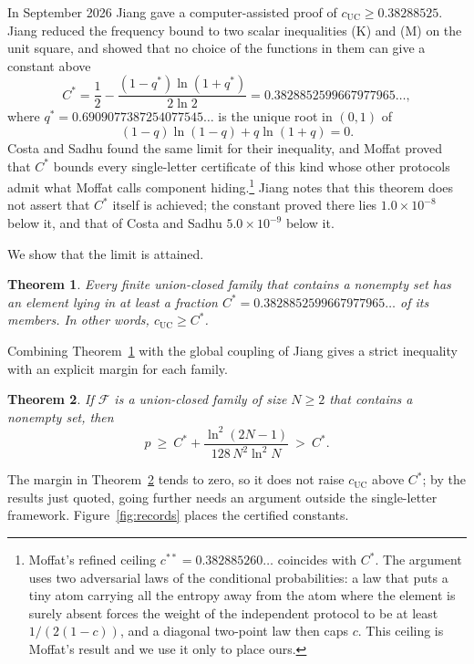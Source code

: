 \documentclass[aps,prd,twocolumn,superscriptaddress,nofootinbib,longbibliography,floatfix,amsmath,amssymb,10pt]{revtex4-2}
\theoremstyle{plain}
\theoremstyle{definition}
\theoremstyle{plain}
\newtheorem{mainthm}{Theorem}
\newcommand{\cF}{\mathcal{F}}
\newcommand{\qs}{q^{*}}
\newcommand{\Cs}{C^{*}}
\begin{document}
In September 2026 Jiang \cite{Jia26} gave a computer-assisted proof of $c_{\mathrm{UC}}\ge 0.38288525$. Jiang reduced the frequency bound to two scalar inequalities (K) and (M) on the unit square, and showed that no choice of the functions in them can give a constant above
\begin{equation}\label{eq:Cstar}
\Cs=\frac12-\frac{(1-\qs)\ln(1+\qs)}{2\ln 2}=0.3828852599667977965\ldots,
\end{equation}
where $\qs=0.6909077387254077545\ldots$ is the unique root in $(0,1)$ of
\begin{equation}\label{eq:qstar}
(1-q)\ln(1-q)+q\ln(1+q)=0 .
\end{equation}
Costa and Sadhu \cite{CS26} found the same limit for their inequality, and Moffat \cite{Mof26} proved that $\Cs$ bounds every single-letter certificate of this kind whose other protocols admit what Moffat calls component hiding.\footnote{Moffat's refined ceiling $c^{**}=0.382885260\ldots$ coincides with $\Cs$. The argument uses two adversarial laws of the conditional probabilities: a law that puts a tiny atom carrying all the entropy away from the atom where the element is surely absent forces the weight of the independent protocol to be at least $1/(2(1-c))$, and a diagonal two-point law then caps $c$. This ceiling is Moffat's result and we use it only to place ours.} Jiang notes that this theorem does not assert that $\Cs$ itself is achieved; the constant proved there lies $1.0\times10^{-8}$ below it, and that of Costa and Sadhu $5.0\times 10^{-9}$ below it.

We show that the limit is attained.

\begin{mainthm}\label{thm:main}
Every finite union-closed family that contains a nonempty set has an element lying in at least a fraction $\Cs=0.3828852599667977965\ldots$ of its members. In other words, $c_{\mathrm{UC}}\ge\Cs$.
\end{mainthm}

Combining Theorem~\ref{thm:main} with the global coupling of Jiang \cite[Theorem~10.2]{Jia26} gives a strict inequality with an explicit margin for each family.

\begin{mainthm}\label{thm:strict}
If $\cF$ is a union-closed family of size $N\ge 2$ that contains a nonempty set, then
\[
p\ \ge\ \Cs+\frac{\ln^2(2N-1)}{128\,N^2\ln^2 N}\ >\ \Cs .
\]
\end{mainthm}

The margin in Theorem~\ref{thm:strict} tends to zero, so it does not raise $c_{\mathrm{UC}}$ above $\Cs$; by the results just quoted, going further needs an argument outside the single-letter framework. Figure~\ref{fig:records} places the certified constants.
\end{document}
